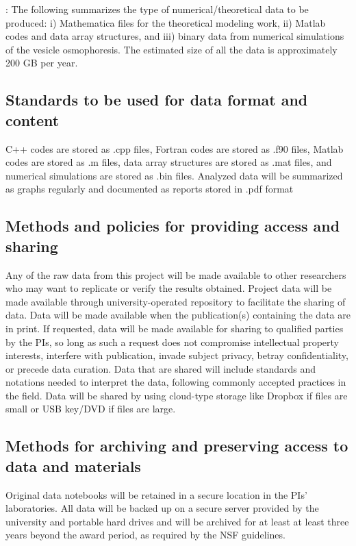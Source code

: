 \documentclass[11pt]{article}
\begin{document}
: The following summarizes the type of
numerical/theoretical data to be produced: i) Mathematica files for the
theoretical modeling work, ii) Matlab codes and data array structures,
and iii) binary data from numerical simulations of the vesicle
osmophoresis. The estimated size of all the data is approximately 200 GB
per year. 

\subsection*{Standards to be used for data format and content}
C++ codes are stored as .cpp files, Fortran codes are stored as .f90
files, Matlab codes are stored as .m files, data array structures are
stored as .mat files, and numerical simulations are stored as .bin
files. Analyzed data will be summarized as graphs regularly and
documented as reports stored in .pdf format 

\subsection*{Methods and policies for providing access and sharing}
Any of the raw data from this project will be made available to other
researchers who may want to replicate or verify the results obtained.
Project data will be made available through university-operated
repository to facilitate the sharing of data. Data will be made
available when the publication(s) containing the data are in print. If
requested, data will be made available for sharing to qualified parties
by the PIs, so long as such a request does not compromise intellectual
property interests, interfere with publication, invade subject privacy,
betray confidentiality, or precede data curation. Data that are shared
will include standards and notations needed to interpret the data,
following commonly accepted practices in the field. Data will be shared
by using cloud-type storage like Dropbox if files are small or USB
key/DVD if files are large. 

\subsection*{Methods for archiving and preserving access to data and
materials}
Original data notebooks will be retained in a secure location in the
PIs' laboratories. All data will be backed up on a secure server
provided by the university and portable hard drives and will be archived
for at least at least three years beyond the award period, as required
by the NSF guidelines.
\end{document}
